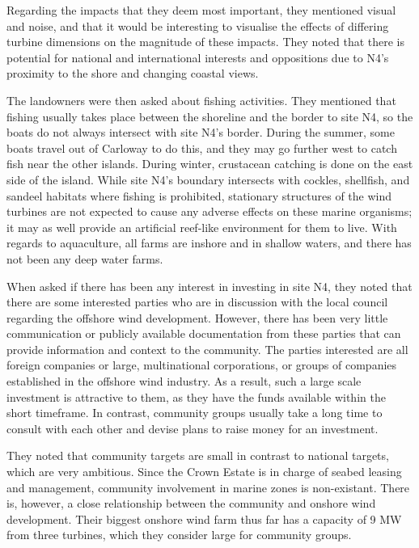 Regarding the impacts that they deem most important, they mentioned visual and
noise, and that it would be interesting to visualise the effects of differing
turbine dimensions on the magnitude of these impacts. They noted that there is
potential for national and international interests and oppositions due to N4's
proximity to the shore and changing coastal views.

The landowners were then asked about fishing activities. They mentioned that
fishing usually takes place between the shoreline and the border to site N4, so
the boats do not always intersect with site N4's border. During the summer,
some boats travel out of Carloway to do this, and they may go further west to
catch fish near the other islands. During winter, crustacean catching is done
on the east side of the island. While site N4's boundary intersects with
cockles, shellfish, and sandeel habitats where fishing is prohibited,
stationary structures of the wind turbines are not expected to cause any
adverse effects on these marine organisms; it may as well provide an artificial
reef-like environment for them to live. With regards to aquaculture, all farms
are inshore and in shallow waters, and there has not been any deep water farms.

When asked if there has been any interest in investing in site N4, they noted
that there are some interested parties who are in discussion with the local
council regarding the offshore wind development. However, there has been very
little communication or publicly available documentation from these parties
that can provide information and context to the community. The parties
interested are all foreign companies or large, multinational corporations, or
groups of companies established in the offshore wind industry. As a result,
such a large scale investment is attractive to them, as they have the funds
available within the short timeframe. In contrast, community groups usually
take a long time to consult with each other and devise plans to raise money for
an investment.

They noted that community targets are small in contrast to national targets,
which are very ambitious. Since the Crown Estate is in charge of seabed leasing
and management, community involvement in marine zones is non-existant. There
is, however, a close relationship between the community and onshore wind
development. Their biggest onshore wind farm thus far has a capacity of 9 MW
from three turbines, which they consider large for community groups.

